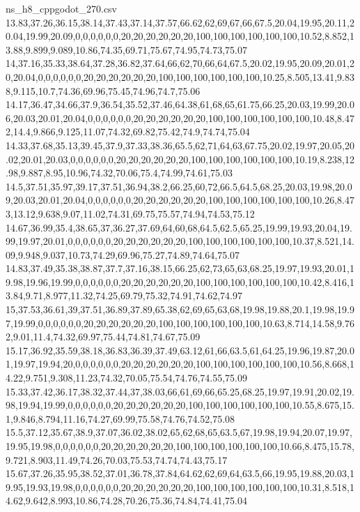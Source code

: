\begin{filecontents*}[overwrite]{ns_h8_cppgodot_270.csv}
13.83,37.26,36.15,38.14,37.43,37.14,37.57,66.62,62,69,67,66,67.5,20.04,19.95,20.11,20.04,19.99,20.09,0,0,0,0,0,0,20,20,20,20,20,20,100,100,100,100,100,100,10.52,8.852,13.88,9.899,9.089,10.86,74.35,69.71,75.67,74.95,74.73,75.07
14,37.16,35.33,38.64,37.28,36.82,37.64,66,62,70,66,64,67.5,20.02,19.95,20.09,20.01,20,20.04,0,0,0,0,0,0,20,20,20,20,20,20,100,100,100,100,100,100,10.25,8.505,13.41,9.838,9.115,10.7,74.36,69.96,75.45,74.96,74.7,75.06
14.17,36.47,34.66,37.9,36.54,35.52,37.46,64.38,61,68,65,61.75,66.25,20.03,19.99,20.06,20.03,20.01,20.04,0,0,0,0,0,0,20,20,20,20,20,20,100,100,100,100,100,100,10.48,8.472,14.4,9.866,9.125,11.07,74.32,69.82,75.42,74.9,74.74,75.04
14.33,37.68,35.13,39.45,37.9,37.33,38.36,65.5,62,71,64,63,67.75,20.02,19.97,20.05,20.02,20.01,20.03,0,0,0,0,0,0,20,20,20,20,20,20,100,100,100,100,100,100,10.19,8.238,12.98,9.887,8.95,10.96,74.32,70.06,75.4,74.99,74.61,75.03
14.5,37.51,35.97,39.17,37.51,36.94,38.2,66.25,60,72,66.5,64.5,68.25,20.03,19.98,20.09,20.03,20.01,20.04,0,0,0,0,0,0,20,20,20,20,20,20,100,100,100,100,100,100,10.26,8.473,13.12,9.638,9.07,11.02,74.31,69.75,75.57,74.94,74.53,75.12
14.67,36.99,35.4,38.65,37,36.27,37.69,64,60,68,64.5,62.5,65.25,19.99,19.93,20.04,19.99,19.97,20.01,0,0,0,0,0,0,20,20,20,20,20,20,100,100,100,100,100,100,10.37,8.521,14.09,9.948,9.037,10.73,74.29,69.96,75.27,74.89,74.64,75.07
14.83,37.49,35.38,38.87,37.7,37.16,38.15,66.25,62,73,65,63,68.25,19.97,19.93,20.01,19.98,19.96,19.99,0,0,0,0,0,0,20,20,20,20,20,20,100,100,100,100,100,100,10.42,8.416,13.84,9.71,8.977,11.32,74.25,69.79,75.32,74.91,74.62,74.97
15,37.53,36.61,39,37.51,36.89,37.89,65.38,62,69,65,63,68,19.98,19.88,20.1,19.98,19.97,19.99,0,0,0,0,0,0,20,20,20,20,20,20,100,100,100,100,100,100,10.63,8.714,14.58,9.762,9.01,11.4,74.32,69.97,75.44,74.81,74.67,75.09
15.17,36.92,35.59,38.18,36.83,36.39,37.49,63.12,61,66,63.5,61,64.25,19.96,19.87,20.01,19.97,19.94,20,0,0,0,0,0,0,20,20,20,20,20,20,100,100,100,100,100,100,10.56,8.668,14.22,9.751,9.308,11.23,74.32,70.05,75.54,74.76,74.55,75.09
15.33,37.42,36.17,38.32,37.44,37,38.03,66,61,69,66,65.25,68.25,19.97,19.91,20.02,19.98,19.94,19.99,0,0,0,0,0,0,20,20,20,20,20,20,100,100,100,100,100,100,10.55,8.675,15.1,9.846,8.794,11.16,74.27,69.99,75.58,74.76,74.52,75.08
15.5,37.12,35.67,38.9,37.07,36.02,38.02,65,62,68,65,63.5,67,19.98,19.94,20.07,19.97,19.95,19.98,0,0,0,0,0,0,20,20,20,20,20,20,100,100,100,100,100,100,10.66,8.475,15.78,9.721,8.903,11.49,74.26,70.03,75.53,74.74,74.43,75.17
15.67,37.26,35.95,38.52,37.01,36.78,37.84,64.62,62,69,64,63.5,66,19.95,19.88,20.03,19.95,19.93,19.98,0,0,0,0,0,0,20,20,20,20,20,20,100,100,100,100,100,100,10.31,8.518,14.62,9.642,8.993,10.86,74.28,70.26,75.36,74.84,74.41,75.04

\end{filecontents*}
